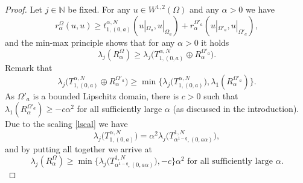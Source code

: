 \documentclass[11pt,oneside,reqno,a4paper]{amsart}
\newcommand{\N}{\mathbb{N}}
\theoremstyle{definition}
\begin{document}
\begin{proof}
Let $j\in\N$ be fixed. For any $u\in W^{1,2}(\Omega)$ and any $\alpha>0$ we have
\[
r^\Omega_\alpha(u,u)\ge t^{\alpha,N}_{1,(0,a)}(u|_{\Omega_a},u|_{\Omega_a})+r^{\Omega'_a}_\alpha (u|_{\Omega'_a},u|_{\Omega'_a}),
\]
and the min-max principle shows that for any $\alpha>0$ it holds
\[
	\lambda_j(R^\Omega_\alpha)\ge \lambda_j\big(T^{\alpha,N}_{1,(0,a)}\oplus R^{\Omega'_a}_\alpha\big).
\]
Remark that
\[
\lambda_j\Big(T^{\alpha,N}_{1,(0,a)}\oplus R^{\Omega'_a}_\alpha\Big)\ge \min\Big\{\lambda_j\big(T^{\alpha,N}_{1,(0,a)}\big),\lambda_1(R^{\Omega'_a}_\alpha)\Big\}.
\]
As $\Omega'_a$ is a bounded Lipschitz domain, there is $c>0$ such that $\lambda_1(R^{\Omega'_a}_\alpha)\ge-c\alpha^2$ for all sufficiently large $\alpha$ (as discussed in the introduction). Due to the scaling \eqref{lscal} we have
\[
\lambda_j\big(T^{\alpha,N}_{1,(0,a)}\big)=\alpha^2 \lambda_j\big(T^{1,N}_{\alpha^{1-q},(0,a\alpha)}\big),
\]
and by putting all together we arrive at
\begin{equation}
	\label{lb3}
	\lambda_j(R^\Omega_\alpha)\ge \min\Big\{\lambda_j\big(T^{1,N}_{\alpha^{1-q},(0,a\alpha)}\big),-c\Big\}\alpha^2
	\text{ for all sufficiently large $\alpha$.}
\end{equation}


\end{proof}
\end{document}
